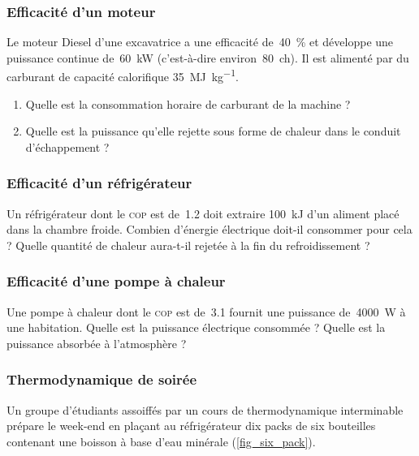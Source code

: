 \begin{boiboiboite}
	\propeau
	\propair
	\isentropiques
\end{boiboiboite}


\subsubsection{Efficacité d’un moteur}
\label{exo_efficacite_moteur}

	Le moteur Diesel d’une excavatrice a une efficacité de~\SI{40}{\percent} et développe une puissance continue de~\SI{60}{\kilo\watt} (c’est-à-dire environ~\SI{80}{ch}). Il est alimenté par du carburant de capacité calorifique \SI{35}{\mega\joule\per\kilogram}.
	
	\begin{enumerate}
		\item Quelle est la consommation horaire de carburant de la machine ?
		\item Quelle est la puissance qu’elle rejette sous forme de chaleur dans le conduit d’échappement ?
	\end{enumerate}

\subsubsection{Efficacité d’un réfrigérateur}
\label{exo_efficacite_refrigerateur}

	Un réfrigérateur dont le \textsc{cop} est de~\num{1,2} doit extraire \SI{100}{\kilo\joule} d’un aliment placé dans la chambre froide. Combien d’énergie électrique doit-il consommer pour cela ? Quelle quantité de chaleur aura-t-il rejetée à la fin du refroidissement ?
	

\subsubsection{Efficacité d’une pompe à chaleur}
\label{exo_efficacite_thermopompe}

	Une pompe à chaleur dont le \textsc{cop} est de~\num{3,1} fournit une puissance de~\SI{4000}{\watt} à une habitation. Quelle est la puissance électrique consommée ? Quelle est la puissance absorbée à l’atmosphère ?


\subsubsection{Thermodynamique de soirée}
\label{exo_bieres}

	Un groupe d’étudiants assoiffés par un cours de thermodynamique interminable prépare le week-end en plaçant au réfrigérateur dix packs de six bouteilles contenant une boisson à base d’eau minérale (\cref{fig_six_pack}).
	
